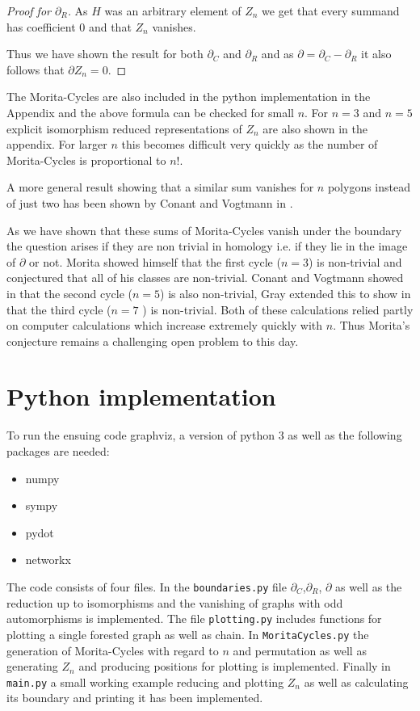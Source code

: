 \begin{proof}[Proof for $\partial_{R}$]
	As $H$ was an arbitrary element of $Z_{n}$ we get that every summand has coefficient $0$ and that $Z_{n}$ vanishes.


	Thus we have shown the result for both $\partial_{C}$ and $\partial_{R}$ and as $\partial = \partial_{C} - \partial_{R}$ it also follows that $\partial Z_{n} = 0$.
\end{proof}

\begin{remark}
	The Morita-Cycles are also included in the python implementation in the Appendix and the above formula can be checked for small $n$.
	For $n=3$ and $n=5$ explicit isomorphism reduced representations of $Z_{n}$ are also shown in the appendix.
	For larger $n$ this becomes difficult very quickly as the number of Morita-Cycles is proportional to $n!$.
\end{remark}

A more general result showing that a similar sum vanishes for $n$ polygons instead of just two
has been shown by Conant and Vogtmann in \cite{conant08}.

As we have shown that these sums of Morita-Cycles vanish under the boundary the question arises if they are
non trivial in homology i.e. if they lie in the image of $\partial$ or not. 
Morita showed himself that the first cycle ($n=3$) is non-trivial and conjectured that 
all of his classes are non-trivial. Conant and Vogtmann showed in \cite{conant04} that 
the second cycle ($n=5$) is also non-trivial, Gray extended this
to show in \cite{gray11} that the third cycle ($n=7$ ) is non-trivial.
Both of these calculations relied partly on computer calculations
which increase extremely quickly with $n$. Thus Morita's conjecture
remains a challenging open problem to this day.

\newpage
\printbibliography
\newpage
\appendix
\section{Python implementation}
To run the ensuing code graphviz, a version of python 3 as well as the following packages are needed:
\begin{itemize}
	\item numpy
	\item sympy
	\item pydot
	\item networkx
\end{itemize}
The code consists of four files.
In the \texttt{boundaries.py} file $\partial_{C}$,$\partial_{R}$, $\partial$ as well as
the reduction up to isomorphisms and the vanishing of graphs with odd automorphisms is implemented.
The file \texttt{plotting.py} includes functions for plotting a single forested graph as well as chain.
In \texttt{MoritaCycles.py} the generation of Morita-Cycles with regard to $n$ and permutation as well as
generating $Z_{n}$ and producing positions for plotting is implemented.
Finally in \texttt{main.py} a small working example reducing and plotting $Z_{n}$ as well as calculating
its boundary and printing it has been implemented.

